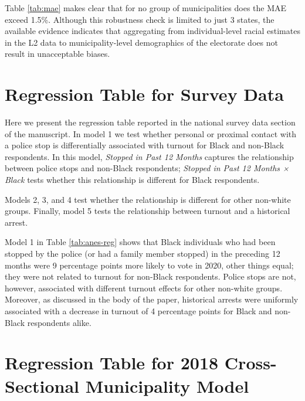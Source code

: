 \documentclass[
  12pt,
]{article}
\begin{document}
Table \ref{tab:mae} makes clear that for no group of municipalities does the MAE exceed 1.5\%. Although this robustness check is limited to just 3 states, the available evidence indicates that aggregating from individual-level racial estimates in the L2 data to municipality-level demographics of the electorate does not result in unacceptable biases.

\hypertarget{regression-table-for-survey-data}{%
\section*{Regression Table for Survey Data}\label{regression-table-for-survey-data}}

Here we present the regression table reported in the national survey data section of the manuscript. In model 1 we test whether personal or proximal contact with a police stop is differentially associated with turnout for Black and non-Black respondents. In this model, \emph{Stopped in Past 12 Months} captures the relationship between police stops and non-Black respondents; \emph{Stopped in Past 12 Months × Black} tests whether this relationship is different for Black respondents.

Models 2, 3, and 4 test whether the relationship is different for other non-white groups. Finally, model 5 tests the relationship between turnout and a historical arrest.

\begin{singlespace}

\end{singlespace}

Model 1 in Table \ref{tab:anes-reg} shows that Black individuals who had been stopped by the police (or had a family member stopped) in the preceding 12 months were 9 percentage points more likely to vote in 2020, other things equal; they were not related to turnout for non-Black respondents. Police stops are not, however, associated with different turnout effects for other non-white groups. Moreover, as discussed in the body of the paper, historical arrests were uniformly associated with a decrease in turnout of 4 percentage points for Black and non-Black respondents alike.

\hypertarget{regression-table-for-2018-cross-sectional-municipality-model}{%
\section*{Regression Table for 2018 Cross-Sectional Municipality Model}\label{regression-table-for-2018-cross-sectional-municipality-model}}
\end{document}
